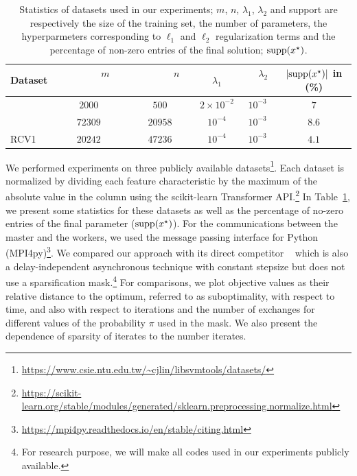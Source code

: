 \begin{table}[b]
\begin{center}
\begin{tabular}{lccccc}
\hline 
Dataset              & ~~~~~~$m$~~~~~~ & ~~~~~~$n$~~~~~~ & ~~$\lambda_1$~~ & ~~$\lambda_2$~~ & $|\mathrm{supp}(x^\star)|$ in (\%) \\
\hline
\vspace{1mm}{Madelon}         &{$2000$} & {$500$} & $2\times10^{-2}$ & $10^{-3}$ & $7$  \\%
\vspace{1mm}{Real-sim}    & {$72309$} & {$20958$} & $10^{-4}$ & $10^{-3}$ & $8.6$ \\%
{RCV1}    & {$20242$} & {$47236$} & $10^{-4}$ & $10^{-3}$ & $4.1$ \\%
\hline %
\end{tabular}
\end{center}
\caption{Statistics of datasets used in our experiments; $m$, $n$, $\lambda_1$, $\lambda_2$ and support are respectively the size of the training set, the number of parameters, the hyperparmeters corresponding to $\ell_1$ and $\ell_2$ regularization terms and the percentage of non-zero entries of the final solution; $\mathrm{supp}(x^\star)$.}
\label{tab:datasets}
\end{table}

We performed experiments on three publicly available datasets\footnote{\url{https://www.csie.ntu.edu.tw/~cjlin/libsvmtools/datasets/}}. Each dataset is normalized by dividing each feature characteristic by the maximum of the absolute value in the column using the scikit-learn Transformer API.\footnote{\url{https://scikit-learn.org/stable/modules/generated/sklearn.preprocessing.normalize.html}} In Table~\ref{tab:datasets}, we present some statistics for these datasets as well as the percentage of no-zero entries of the final parameter ($\mathrm{supp}(x^\star)$). 
For the communications between the master and the workers, we used the message passing interface for Python (MPI4py)\footnote{\url{https://mpi4py.readthedocs.io/en/stable/citing.html}}. We compared our approach \SP{} with its direct competitor \dave~\cite{ICML18} which is also a delay-independent asynchronous technique with constant stepsize but does not use a sparsification mask.\footnote{For research purpose, we will make all codes used in our experiments publicly available.} For comparisons, we plot objective values as their relative distance to the optimum, referred to as suboptimality, with respect to time, and also with respect to iterations and the number of exchanges for different values of the probability $\pi$ used in the mask. We also present the dependence of sparsity of iterates to the number iterates. 



